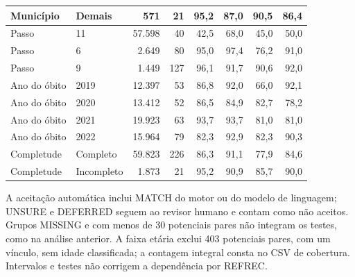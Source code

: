 \begin{table}[htbp]
{\begin{tabular}{llrrrrrr}
Munic\'ipio & Demais & 571 & 21 & 95{,}2 & 87{,}0 & 90{,}5 & 86{,}4 \\
\midrule
Passo & 11 & 57.598 & 40 & 42{,}5 & 68{,}0 & 45{,}0 & 50{,}0 \\
Passo & 6 & 2.649 & 80 & 95{,}0 & 97{,}4 & 76{,}2 & 91{,}0 \\
Passo & 9 & 1.449 & 127 & 96{,}1 & 91{,}7 & 90{,}6 & 92{,}0 \\
\midrule
Ano do \'obito & 2019 & 12.397 & 53 & 86{,}8 & 92{,}0 & 66{,}0 & 92{,}1 \\
Ano do \'obito & 2020 & 13.412 & 52 & 86{,}5 & 84{,}9 & 82{,}7 & 78{,}2 \\
Ano do \'obito & 2021 & 19.923 & 63 & 93{,}7 & 93{,}7 & 81{,}0 & 81{,}0 \\
Ano do \'obito & 2022 & 15.964 & 79 & 82{,}3 & 92{,}9 & 82{,}3 & 90{,}3 \\
\midrule
Completude & Completo & 59.823 & 226 & 86{,}3 & 91{,}1 & 77{,}9 & 84{,}6 \\
Completude & Incompleto & 1.873 & 21 & 95{,}2 & 90{,}9 & 85{,}7 & 90{,}0 \\
\bottomrule
\end{tabular}}
\par\smallskip\begin{minipage}{\linewidth}\footnotesize A aceitação automática inclui MATCH do motor ou do modelo de linguagem; UNSURE e DEFERRED seguem ao revisor humano e contam como não aceitos. Grupos MISSING e com menos de 30 potenciais pares não integram os testes, como na análise anterior. A faixa etária exclui 403 potenciais pares, com um vínculo, sem idade classificada; a contagem integral consta no CSV de cobertura. Intervalos e testes não corrigem a dependência por REFREC.\end{minipage}\end{table}
